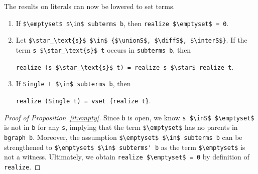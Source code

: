 \documentclass[sigplan,10pt,anonymous,review]{acmart}
\newcommand{\unionS}{\sqcup_\text{s}}
\newcommand{\interS}{\sqcap_\text{s}}
\newcommand{\diffS}{-_\text{s}}
\newcommand{\inS}{\in_\text{s}}
\begin{document}
\noindent The results on literals can now be lowered to set terms.
\begin{enumerate}[label=(\alph*)]
  \item\label{it:empty} If \lstinline!$\emptyset$ $\in$ subterms b!, then \lstinline!realize $\emptyset$ = 0!.
  \item\label{it:op} Let \lstinline!$\star_\text{s}$ $\in$ {$\unionS$, $\diffS$, $\interS$}!. If the term \lstinline!s $\star_\text{s}$ t! occurs in \lstinline!subterms b!, then
    \begin{center}
    \lstinline!realize (s $\star_\text{s}$ t) = realize s $\star$ realize t!.
    \end{center}
  \item\label{it:single} If \lstinline!Single t $\in$ subterms b!, then
    \begin{center}
    \lstinline!realize (Single t) = vset {realize t}!.
    \end{center}
\end{enumerate}
\begin{proof}[Proof of Proposition~\ref{it:empty}]
  Since \lstinline!b! is open, we know \lstinline!s $\inS$ $\emptyset$! is not in \lstinline!b! for any \lstinline!s!, implying that the term \lstinline!$\emptyset$! has no parents in \lstinline!bgraph b!.
  Moreover, the assumption \lstinline!$\emptyset$ $\in$ subterms b! can be strengthened to \lstinline!$\emptyset$ $\in$ subterms' b! as the term \lstinline!$\emptyset$! is not a witness. 
  Ultimately, we obtain \lstinline!realize $\emptyset$ = 0! by definition of \lstinline!realize!.
\end{proof}
\end{document}
